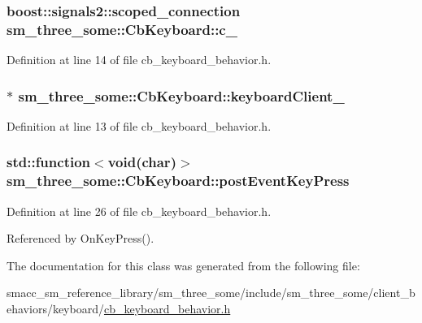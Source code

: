 \subsubsection[{\texorpdfstring{c\+\_\+}{c_}}]{\setlength{\rightskip}{0pt plus 5cm}boost\+::signals2\+::scoped\+\_\+connection sm\+\_\+three\+\_\+some\+::\+Cb\+Keyboard\+::c\+\_\+}\hypertarget{classsm__three__some_1_1CbKeyboard_a6b6a885c39f32f29e907cfbc37b08b6f}{}\label{classsm__three__some_1_1CbKeyboard_a6b6a885c39f32f29e907cfbc37b08b6f}


Definition at line 14 of file cb\+\_\+keyboard\+\_\+behavior.\+h.

\subsubsection[{\texorpdfstring{keyboard\+Client\+\_\+}{keyboardClient_}}]{$\ast$ sm\+\_\+three\+\_\+some\+::\+Cb\+Keyboard\+::keyboard\+Client\+\_\+}\hypertarget{classsm__three__some_1_1CbKeyboard_a00f70614cf0c1e10f4214cf24b1d4013}{}\label{classsm__three__some_1_1CbKeyboard_a00f70614cf0c1e10f4214cf24b1d4013}


Definition at line 13 of file cb\+\_\+keyboard\+\_\+behavior.\+h.

\subsubsection[{\texorpdfstring{post\+Event\+Key\+Press}{postEventKeyPress}}]{\setlength{\rightskip}{0pt plus 5cm}std\+::function$<$void(char)$>$ sm\+\_\+three\+\_\+some\+::\+Cb\+Keyboard\+::post\+Event\+Key\+Press}\hypertarget{classsm__three__some_1_1CbKeyboard_a746c413234e920c55625d63f4a6be784}{}\label{classsm__three__some_1_1CbKeyboard_a746c413234e920c55625d63f4a6be784}


Definition at line 26 of file cb\+\_\+keyboard\+\_\+behavior.\+h.



Referenced by On\+Key\+Press().



The documentation for this class was generated from the following file\+:\begin{DoxyCompactItemize}
\item 
smacc\+\_\+sm\+\_\+reference\+\_\+library/sm\+\_\+three\+\_\+some/include/sm\+\_\+three\+\_\+some/client\+\_\+behaviors/keyboard/\hyperlink{cb__keyboard__behavior_8h}{cb\+\_\+keyboard\+\_\+behavior.\+h}\end{DoxyCompactItemize}
